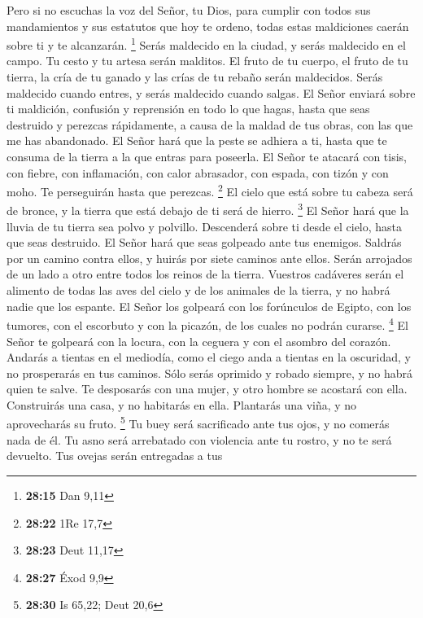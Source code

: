  Pero si no escuchas la voz del Señor, tu Dios, para
cumplir con todos sus mandamientos y sus estatutos que hoy te ordeno,
todas estas maldiciones caerán sobre ti y te alcanzarán. \footnote{\textbf{28:15}
  Dan 9,11}  Serás maldecido en la ciudad, y serás
maldecido en el campo.  Tu cesto y tu artesa serán
malditos.  El fruto de tu cuerpo, el fruto de tu tierra,
la cría de tu ganado y las crías de tu rebaño serán maldecidos.
 Serás maldecido cuando entres, y serás maldecido cuando
salgas.  El Señor enviará sobre ti maldición, confusión y
reprensión en todo lo que hagas, hasta que seas destruido y perezcas
rápidamente, a causa de la maldad de tus obras, con las que me has
abandonado.  El Señor hará que la peste se adhiera a ti,
hasta que te consuma de la tierra a la que entras para poseerla.
 El Señor te atacará con tisis, con fiebre, con
inflamación, con calor abrasador, con espada, con tizón y con moho. Te
perseguirán hasta que perezcas. \footnote{\textbf{28:22} 1Re 17,7}
 El cielo que está sobre tu cabeza será de bronce, y la
tierra que está debajo de ti será de hierro. \footnote{\textbf{28:23}
  Deut 11,17}  El Señor hará que la lluvia de tu tierra
sea polvo y polvillo. Descenderá sobre ti desde el cielo, hasta que seas
destruido.  El Señor hará que seas golpeado ante tus
enemigos. Saldrás por un camino contra ellos, y huirás por siete caminos
ante ellos. Serán arrojados de un lado a otro entre todos los reinos de
la tierra.  Vuestros cadáveres serán el alimento de todas
las aves del cielo y de los animales de la tierra, y no habrá nadie que
los espante.  El Señor los golpeará con los forúnculos de
Egipto, con los tumores, con el escorbuto y con la picazón, de los
cuales no podrán curarse. \footnote{\textbf{28:27} Éxod 9,9}
 El Señor te golpeará con la locura, con la ceguera y con
el asombro del corazón.  Andarás a tientas en el
mediodía, como el ciego anda a tientas en la oscuridad, y no prosperarás
en tus caminos. Sólo serás oprimido y robado siempre, y no habrá quien
te salve.  Te desposarás con una mujer, y otro hombre se
acostará con ella. Construirás una casa, y no habitarás en ella.
Plantarás una viña, y no aprovecharás su fruto. \footnote{\textbf{28:30}
  Is 65,22; Deut 20,6}  Tu buey será sacrificado ante tus
ojos, y no comerás nada de él. Tu asno será arrebatado con violencia
ante tu rostro, y no te será devuelto. Tus ovejas serán entregadas a tus
